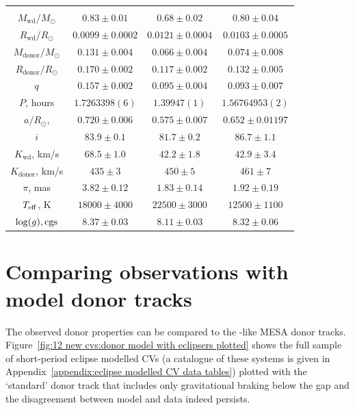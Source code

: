 \begin{table}
\begin{tabular}{cccc}
        \hline \hline \\
        $M_\mathrm{wd}/M_\odot$     & $0.83\pm0.01$     & $0.68\pm0.02$          & $0.80\pm0.04$           \\
        $R_\mathrm{wd}/R_\odot$     & $0.0099\pm0.0002$ & $0.0121\pm0.0004$      & $0.0103\pm0.0005$       \\
        $M_\mathrm{donor}/M_\odot$  & $0.131\pm0.004$   & $0.066\pm0.004$        & $0.074\pm0.008$         \\
        $R_\mathrm{donor}/R_\odot$  & $0.170\pm0.002$   & $0.117\pm0.002$        & $0.132\pm0.005$         \\
        $q$                         & $0.157\pm0.002$   & $0.095\pm0.004$        & $0.093\pm0.007$         \\
        \hline
        $P$, hours                  & $1.7263398(6)$    & $1.39947(1)$           & $1.56764953(2)$         \\
        $a/R_\odot$,                & $0.720\pm0.006$   & $0.575\pm0.007$        & $0.652\pm0.01197$       \\
        $i$                         & $83.9\pm0.1$      & $81.7\pm0.2$           & $86.7\pm1.1$            \\
        $K_\mathrm{wd}$, km/s       & $68.5\pm1.0$      & $42.2\pm1.8$           & $42.9\pm3.4$            \\
        $K_\mathrm{donor}$, km/s    & $435\pm3$         & $450\pm5$              & $461\pm7$               \\
        \hline
        $\pi$, mas                  & $3.82\pm0.12$     & $1.83\pm0.14$          & $1.92\pm0.19$           \\
        $T_{\rm eff}$, K            & $18000\pm4000$    & $22500\pm3000$         & $12500\pm1100$          \\
        $\log(g), {\rm cgs}$        & $8.37\pm0.03$     & $8.11\pm0.03$          & $8.32\pm0.06$           \\
        \hline
        \hline
    \end{tabular}
\end{table}



\section{Comparing observations with model donor tracks}
\label{sect:12 new cvs:eclipse modelling of 12 CVs}

The observed donor properties can be compared to the \citet{knigge11}-like MESA donor tracks. Figure~\ref{fig:12 new cvs:donor model with eclipsers plotted} shows the full sample of short-period eclipse modelled CVs (a catalogue of these systems is given in Appendix~\ref{appendix:eclipse modelled CV data tables}) plotted with the `standard' donor track that includes only gravitational braking below the gap and the disagreement between model and data indeed persists.

